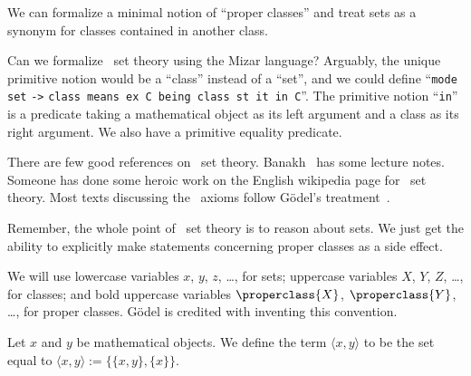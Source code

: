 \begin{node}\label{nbg-0000}%
We can formalize a minimal notion of ``proper classes'' and treat
sets as a synonym for classes contained in another class.
\end{node}

\begin{puzzle}\label{nbg-0001}%
Can we formalize \NBG\ set theory using the Mizar language? Arguably, the
unique primitive notion would be a ``class'' instead of a ``set'', and
we could define ``\texttt{mode set} \verb|->| \texttt{class means ex C
  being class st it in C}''. The primitive notion ``\texttt{in}'' is a
predicate taking a mathematical object as its left argument and a class
as its right argument. We also have a primitive equality predicate.

\begin{node}[References]\label{nbg-0002}%
There are few good references on \NBG\ set
theory. Banakh~\cite{banakh2023classical} has some lecture
notes. Someone has done some heroic work on the English wikipedia page
for \NBG\ set theory. Most texts discussing the \NBG\ axioms follow
G\"{o}del's treatment~\cite{godel1940consistency}.
\end{node}

\begin{node}\label{nbg-0003}%
Remember, the whole point of \NBG\ set theory is to reason about sets. We
just get the ability to explicitly make statements concerning proper
classes as a side effect.
\end{node}
\end{puzzle}

\begin{node}[Conventions]\label{nbg-000F}%
We will use lowercase variables $x$, $y$, $z$, \dots, for sets;
uppercase variables $X$, $Y$, $Z$, \dots, for classes; and bold
uppercase variables $\properclass{X}$, $\properclass{Y}$, \dots, for proper classes.
G\"{o}del is credited with inventing this convention.
\end{node}

\begin{definition}\label{nbg-0007}%
Let $x$ and $y$ be mathematical objects. We define the term $\langle x,y\rangle$
to be the set equal to $\langle x,y\rangle := \{\{x,y\}, \{x\}\}$.
\end{definition}

